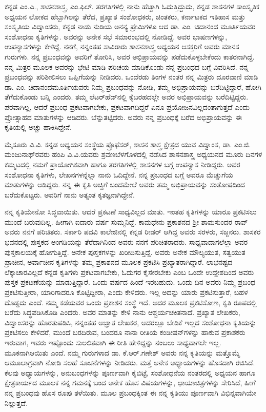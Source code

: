 ಕನ್ನಡ ಎಂ.ಎ., ಶಾಸನಶಾಸ್ತ್ರ, ಎಂ.ಫಿಲ್​. ತರಗತಿಗಳಲ್ಲಿ ನಾನು ಹೆಚ್ಚಾಗಿ ಓದುತ್ತಿದ್ದುದು, ಕನ್ನಡ ಶಾಸನಗಳ ಸಾಂಸ್ಕೃತಿಕ ಅಧ್ಯಯನ ಲೋಕದ ಹೆಬ್ಬಾಗಿಲನ್ನು ತೆರೆದ, ಪ್ರಖ್ಯಾತ ಸಂಶೋಧಕರು, ಚಿಂತಕರು,  ಕರ್ನಾಟಕದ ಇತಿಹಾಸ ಮತ್ತು ಸಂಸ್ಕೃತಿಯ ವಿದ್ವಾಂಸರು, ಕನ್ನಡ ನಾಡು ನುಡಿಯ ಅನನ್ಯ ಪ್ರೇಮಿಗಳೂ ಆದ ಡಾ. ಎಂ. ಚಿದಾನಂದ ಮೂರ್ತಿಯವರ ಸಂಶೋಧನಾ ಕೃತಿಗಳನ್ನು.  ಅವರನ್ನು ಅನೇಕ ಸಭೆ ಸಮಾರಂಭದಲ್ಲಿ ನೋಡಿದ್ದೆ. ಅವರ ಭಾಷಣಗಳನ್ನು, ಉಪನ್ಯಾಸಗಳನ್ನು \hbox{ಕೇಳಿದ್ದೆ}. ನನಗೆ, ನನ್ನಂತಹ ಸಾವಿರಾರು ಶಾಸನಶಾಸ್ತ್ರ ಅಧ್ಯಯನ ಆಸಕ್ತರಿಗೆ ಅವರು ಮಾನಸ ಗುರುಗಳು. ನನ್ನ ಪ್ರಬಂಧವನ್ನು ಅವರಿಗೆ ತೋರಿಸಿ, ಅವರ ಅಭಿಪ್ರಾಯವನ್ನು ಪಡೆದುಕೊಳ್ಳಬೇಕೆಂದು ಕಾತರನಾಗಿದ್ದೆ. ನನ್ನ ಮಿತ್ರರ ಮೂಲಕ ಅವರನ್ನು ಭೇಟಿ ಮಾಡಿ ಪರಿಚಯ ಮಾಡಿಕೊಂಡು ನನ್ನ ಪ್ರಬಂಧದ ಬಗ್ಗೆ ವಿವರಿಸಿದೆ. ನನ್ನ ಪ್ರಬಂಧವನ್ನು ಪರಿಶೀಲಿಸಲು ಒಪ್ಪಿಗೆಯನ್ನು ನೀಡಿದರು. ಒಂದೆರಡು ತಿಂಗಳ ನಂತರ ನನ್ನ ಮಿತ್ರರು ದೂರವಾಣಿ ಮಾಡಿ ಡಾ. ಎಂ. ಚಿದಾನಂದಮೂರ್ತಿಯವರು ನಿಮ್ಮ ಪ್ರಬಂಧವನ್ನು ನೋಡಿ, ತಮ್ಮ ಅಭಿಪ್ರಾಯವನ್ನು ಬರೆದಿಟ್ಟಿದ್ದಾರೆ, ಹೋಗಿ ತೆಗೆದುಕೊಂಡು ಬನ್ನಿ ಎಂದರು. ತಮ್ಮ ಲೆಟರ್​\-ಹೆಡ್​ನಲ್ಲಿ ಕೈಬರಹದಲ್ಲೇ ಅವರ ಅಭಿಪ್ರಾಯವನ್ನು ಬರೆದಿಟ್ಟಿದ್ದರು.  ಪರವಾಗಿಲ್ಲ, ಆದರೆ ಪ್ರಬಂಧ ಪ್ರಕಟವಾಗಬೇಕು, ಪ್ರಕಟವಾಗದಿದ್ದರೆ ಏನೂ ಪ್ರಯೋಜನವಿಲ್ಲದಂತಾಗುತ್ತದೆ ಎಂದು ಪ್ರೋತ್ಸಾಹದ ಮಾತುಗಳನ್ನು ಆಡಿದರು. ಬೆನ್ನುತಟ್ಟಿದರು. ಅವರು ನನ್ನ ಪ್ರಬಂಧಕ್ಕೆ ಬರೆದ ಅಭಿಪ್ರಾಯವನ್ನು ಈ ಕೃತಿಯಲ್ಲಿ ಅಚ್ಚು ಹಾಕಿಸಿದ್ದೇನೆ.

ಮೈಸೂರು ವಿ.ವಿ. ಕನ್ನಡ ಅಧ್ಯಯನ ಸಂಸ್ಥೆಯ ಪ್ರೊಫೆಸರ್​, ಶಾಸನ ಶಾಸ್ತ್ರ ಕ್ಷೇತ್ರದ ಯುವ ವಿದ್ವಾಂಸ,  ಡಾ. ಎಂ.ಜಿ. ಮಂಜುನಾಥ್​ರವರು ಹಂಪಿ ವಿ.ವಿ.ಯವರು ಶ್ರವಣಬೆಳಗೊಳದಲ್ಲಿ ನಡೆಸಿದ ಶಾಸನಶಾಸ್ತ್ರ ಅಧ್ಯಯನದ ಮೂರು ದಿನಗಳ ಕಮ್ಮಟ\-ದಲ್ಲಿ ನಮಗೆ ಪ್ರಾಯೋಗಿಕವಾಗಿ ಹಾಗೂ ತರಗತಿಗಳಲ್ಲಿ ಶಾಸನಗಳ ಬಗ್ಗೆ ಉಪನ್ಯಾಸ ನೀಡಿದ್ದರು. ಅವರ ಸಂಶೋಧನಾ ಕೃತಿಗಳು, ಲೇಖನಗಳನ್ನೆಲ್ಲಾ ನಾನು ಓದಿದ್ದೇನೆ. ನನ್ನ ಪ್ರಬಂಧದ ಬಗ್ಗೆ ಅವರೂ ಮೆಚ್ಚುಗೆಯ ಮಾತುಗಳನ್ನು ಆಡಿದ್ದರು. ನನ್ನ ಈ ಕೃತಿ ಅಚ್ಚಿಗೆ ಬಂದಮೇಲೆ ಅವರು ತಮ್ಮ ಅಭಿಪ್ರಾಯವನ್ನು ಸಂತೋಷದಿಂದ ಬರೆದುಕೊಟ್ಟರು. ಅವರಿಗೆ ನಾನು ಅತ್ಯಂತ ಕೃತಜ್ಞನಾಗಿದ್ದೇನೆ.

ನನ್ನ ಕೃತಿಯೇನೋ ಸಿದ್ಧವಾಯಿತು. ಆದರೆ ಪ್ರಕಟಣೆ ಸಾಧ್ಯವಿಲ್ಲದ ಮಾತು. ಇಂತಹ ಕೃತಿಗಳನ್ನು ಯಾರೂ ಪ್ರಕಟಿ\-ಸಲು ಮುಂದೆ ಬರುವುದಿಲ್ಲ. ಹೀಗಾಗಿ ಐದಾರು ವರ್ಷ ಸುಮ್ಮನಿದ್ದೆ.  ಕಾಮಧೇನು ಪ್ರಕಾಶನದ ಶ್ರೀ ಶಾಮಸುಂದರ ರಾವ್​ ಅವರು ನನಗೆ ಪರಿಚಿತರು.  ಸರ್ಕಾರಿ ಪದವಿ ಕಾಲೇಜಿನಲ್ಲಿ ಕನ್ನಡ ರೀಡರ್​ ಆಗಿದ್ದ ಅವರು ಸರಳರು, ಸಜ್ಜನರು. ಶಾಸಕರ ಭವನದಲ್ಲಿ ಪುಸ್ತಕದ ಅಂಗಡಿಯನ್ನು ತೆರೆದಾಗಿನಿಂದ ಅವರು ನನಗೆ ಪರಿಚಿತರಾದರು. ಸಾಧ್ಯ\-ವಾದಾಗಲೆಲ್ಲಾ ಅವರ ಪುಸ್ತಕಾಲ\-ಯಕ್ಕೆ ಹೋಗುತ್ತಿದ್ದೆ. ಅನೇಕ ಪುಸ್ತಕಗಳನ್ನು ಖರೀದಿಸುತ್ತಿದ್ದೆ. ಅವರು ಅನೇಕ ಮೌಲ್ಯಯುತ, ಸತ್ವಯುತ ಪ್ರಾಚೀನ, ಅರ್ವಾಚೀನ ಕೃತಿಗಳನ್ನು ತಮ್ಮ ಪ್ರಕಾಶನದ ಮೂಲಕ ಪ್ರಕಟಿಸಿ ಪ್ರಖ್ಯಾತರಾಗಿದ್ದಾರೆ. ಲಾಭ\-ನಷ್ಟದ ಲೆಕ್ಕಾಚಾರವಿಲ್ಲದೆ ಕನ್ನಡ ಕೃತಿಗಳು ಪ್ರಕಟವಾಗಬೇಕು, ಓದುಗರ ಕೈಸೇರಬೇಕು ಎಂಬ ಒಂದೇ ಉದ್ದೇಶದಿಂದ ಅವರು ಪುಸ್ತಕ ಪ್ರಕಟಣೆಯನ್ನು ಮಾಡುತ್ತಿದ್ದಾರೆ.  ಒಂದು ವರ್ಷದ ಹಿಂದೆ ಇರಬಹುದು.  ಒಂದು ದಿನ ಅವರು ನಿಮ್ಮ ಪ್ರಬಂಧ ಪ್ರಕಟಿಸು\-ತ್ತೀರಾ, ಯಾರಿಗಾದರೂ ಕೊಟ್ಟಿದ್ದೀರಾ, ಎಂದು ಕೇಳಿದರು. ಇಲ್ಲ ಅದನ್ನು ಯಾರು ಪ್ರಕಟಿಸುತ್ತಾರೆ, ಬಹಳ ದೊಡ್ಡದು ಎಂದೆ. ನಮ್ಮ ಕಡೆಯವರ ಒಂದು ಪ್ರಕಾಶನ ಸಂಸ್ಥೆ ಇದೆ. ಅದರ ಮೂಲಕ ಪ್ರಕಟಿಸೋಣ, ಕೃತಿ ರೂಪದಲ್ಲಿ ಬರೆದು ಸಿದ್ಧಪಡಿಸಿಕೊಡಿ ಎಂದರು. ಅವರ ಮಾತನ್ನು ಕೇಳಿ ನಾನು ಆಶ್ಚರ್ಯಚಕಿತನಾದೆ. ಪ್ರಖ್ಯಾತ ಲೇಖಕರು, ವಿದ್ವಾಂಸರನ್ನು ಹೊರತುಪಡಿಸಿ, ನನ್ನಂತಹ ಅಜ್ಞಾತ ಲೇಖಕರ, ಅದರಲ್ಲೂ ಬೇಡಿಕೆ ಇಲ್ಲದ ಸಂಶೋಧನಾ ಕೃತಿಯನ್ನು ಪ್ರಕಟಿಸಲು ಕೇಳಿದರೆ, ಮುಂದೆ ಬರದಿರುವ, ಬಂದರೂ ನಾನಾ ರೀತಿಯ ಕಂಡೀಷನ್​ಗಳನ್ನು ಹಾಕುವ ಪ್ರಕಾಶಕರು ಇರುವಾಗ, ಇವರು ಇಷ್ಟೊಂದು ಸುಲಲಿತವಾಗಿ ಈ ರೀತಿ ಹೇಳಿದ್ದನ್ನು ನಂಬಲು ಸಾಧ್ಯವಾಗಲೇ ಇಲ್ಲ. ಮೂಕನಾಗಿ\break ಆಯಿತು ಎಂದೆ. ನಮ್ಮ ಗುರುಗಳಾದ ಡಾ. ಕೆ.ಆರ್​.ಗಣೇಶ್​ ಅವರು ನನ್ನ ಕೃತಿಯನ್ನು ಮತ್ತೊಮ್ಮೆ ಆಮೂಲಾಗ್ರವಾಗಿ ನೋಡಿ ಸಲಹೆ ಸೂಚನೆಗಳನ್ನು ನೀಡಿದರು. ಮತ್ತೆ ಅನೇಕ ಅಧ್ಯಾಯಗಳನ್ನು ಹೊಸದಾಗಿ ರಚಿಸಿದೆ. ಕೆಲವು ಅಧ್ಯಾಯಗಳನ್ನು, ಅನು\-ಬಂಧಗಳನ್ನು ಪೂರ್ಣವಾಗಿ ಕೈಬಿಟ್ಟೆ, ಸಂಶೋಧನೆಯ ನಂತರದಲ್ಲಿ  ಅಧ್ಯಯನ ಹಾಗೂ ಕ್ಷೇತ್ರಕಾರ್ಯದ ಮೂಲಕ  ನನ್ನ ಗಮನಕ್ಕೆ ಬಂದ ಅನೇಕ ಹೊಸ ವಿಷಯಗಳನ್ನು, ಛಾಯಾಚಿತ್ರಗಳನ್ನು ಸೇರಿಸಿದೆ, ಹೀಗೆ ನನ್ನ ಪ್ರಬಂಧವು ಹೊಸ ರೂಪು ತಳೆಯಿತು. ಮೂಲ ಪ್ರಬಂಧಕ್ಕಿಂತ ಈ ನನ್ನ ಕೃತಿಯು ಪೂರ್ಣವಾಗಿ ವಿಭಿನ್ನವಾಗಿಯೇ ನಿಲ್ಲುತ್ತದೆ.

